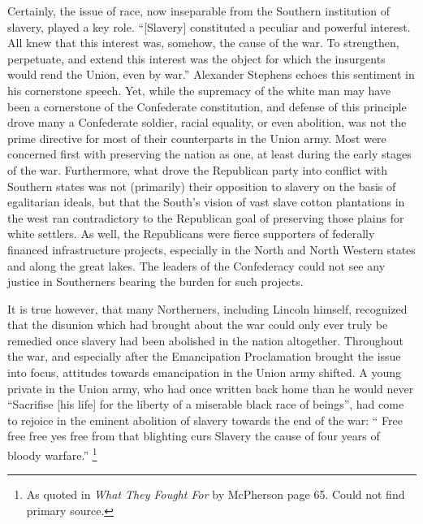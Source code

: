 \documentclass[a4paper]{article}
\begin{document}
Certainly, the issue of race, now inseparable from the Southern institution of slavery, played a key role. “[Slavery] constituted a peculiar and powerful interest. All knew that this interest was, somehow, the cause of the war. To strengthen, perpetuate, and extend this interest was the object for which the insurgents would rend the Union, even by war.” \autocite[]{Lincoln}Alexander Stephens echoes this sentiment in his cornerstone speech. \autocite[]{Stephens} Yet, while the supremacy of the white man may have been a cornerstone of the Confederate constitution, and defense of this principle drove many a Confederate soldier, racial equality, or even abolition, was not the  prime directive for most of their counterparts in the Union army. \autocite[pp. 47-69]{WhatFoughtFor} Most were concerned first with preserving the nation as one, at least during the early stages of the war. Furthermore, what drove the Republican party into conflict with Southern states was not (primarily) their opposition to slavery on the basis of egalitarian ideals, but that the South’s vision of vast slave cotton plantations in the west ran contradictory to the Republican goal of preserving those plains for white settlers. As well, the Republicans were fierce supporters of federally financed infrastructure projects, especially in the North and North Western states and along the great lakes. The leaders of the Confederacy could not see any justice in Southerners bearing the burden for such projects.\autocite[]{Stephens}  

It is true however, that many Northerners, including Lincoln himself, recognized that the disunion which had brought about the war could only ever truly be remedied once slavery had been abolished in the nation altogether.\autocite[]{HouseDivided, WhatFoughtFor} Throughout the war, and especially after the Emancipation Proclamation brought the issue into focus, attitudes towards emancipation in the Union army shifted. A young private in the Union army, who had once written back home than he would never “Sacrifise [his life] for the liberty of a miserable black race of beings”, had come to rejoice in the eminent abolition of slavery towards the end of the war: “ Free free free yes free from that blighting curs Slavery the cause of four years of bloody warfare.” \footnote{As quoted in \textit{What They Fought For} by McPherson page 65. Could not find primary source.} 
\end{document}
